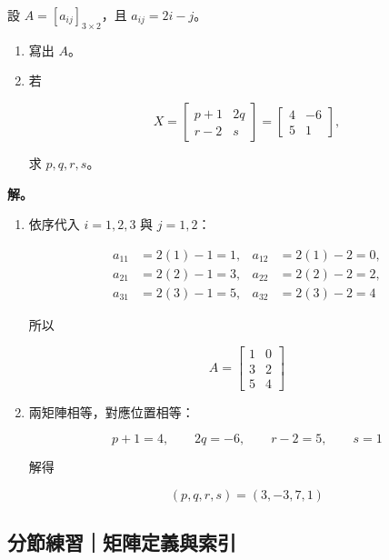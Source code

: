 \documentclass[11pt,a4paper]{article}
\begin{document}
設 \(A=[a_{ij}]_{3\times2}\)，且 \(a_{ij}=2i-j\)。

\begin{enumerate}
\def\labelenumi{\arabic{enumi}.}
\item
  寫出 \(A\)。
\item
  若

  \[
  X=
  \begin{bmatrix}
  p+1&2q\\
  r-2&s
  \end{bmatrix}
  =
  \begin{bmatrix}
  4&-6\\
  5&1
  \end{bmatrix},
  \]

  求 \(p,q,r,s\)。
\end{enumerate}

\textbf{解。}

\begin{enumerate}
\def\labelenumi{\arabic{enumi}.}
\item
  依序代入 \(i=1,2,3\) 與 \(j=1,2\)：

  \[
  \begin{aligned}
  a_{11}&=2(1)-1=1,&a_{12}&=2(1)-2=0,\\
  a_{21}&=2(2)-1=3,&a_{22}&=2(2)-2=2,\\
  a_{31}&=2(3)-1=5,&a_{32}&=2(3)-2=4
  \end{aligned}
  \]

  所以

  \[
  A=\begin{bmatrix}1&0\\3&2\\5&4\end{bmatrix}
  \]
\item
  兩矩陣相等，對應位置相等：

  \[
  p+1=4,\qquad 2q=-6,\qquad r-2=5,\qquad s=1
  \]

  解得

  \[
  (p,q,r,s)=(3,-3,7,1)
  \]
\end{enumerate}

\subsection{分節練習｜矩陣定義與索引}\label{ux5206ux7bc0ux7df4ux7fd2ux77e9ux9663ux5b9aux7fa9ux8207ux7d22ux5f15}
\end{document}
